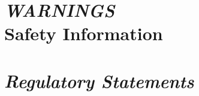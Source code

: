 \documentclass[twoside,12pt,openright,final,english]{memoir}
\newif\iftitle\titletrue
\newif\ifcopyright\copyrighttrue
\newif\ifwarnings\warningstrue %
\newif\ifregulatory\regulatorytrue %
\newif\ifsetup\setupfalse %
\begin{document}
\frontmatter


\iftitle
{}
\fi

\ifcopyright
{}
\fi


\renewcommand{\cftchapterdotsep}{15}
\renewcommand{\cftdot}{\textperiodcentered}	%
\setlength{\cftbeforechapterskip}{5pt}  %
\tableofcontents*

\renewcommand*{\lofheadstart}{\vspace{1cm}}
\clearpage
\listoffigures*

\def\topblockvspace{0.11}


\ifwarnings
\chapter{\emph{WARNINGS}\protect \\
{Safety Information}}
\thispagestyle{empty}
{}
\fi

\ifregulatory
\chapter{\emph{Regulatory Statements}}
\thispagestyle{empty}
{}
\fi


\mainmatter*


\ifsetup
\chapter{\emph{Setup Your Printer}}
\thispagestyle{empty}
\markboth{Setup Your Printer}{LulzBot Mini User Manual}
{}
\fi
\end{document}
